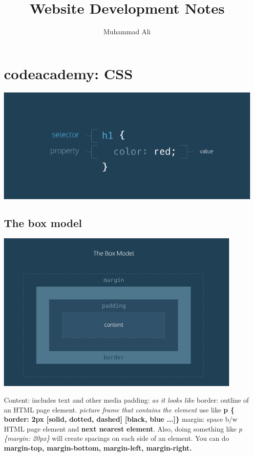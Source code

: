 \documentclass{article}
\begin{document}
\title{Website Development Notes}
\author{Muhammad Ali}
\date{}
\maketitle

\section{codeacademy: CSS}
\includegraphics[scale=0.25]{css-outline.png}
\subsection{The box model}
\includegraphics[scale=0.5]{box-model.png}

Content: includes text and other media \newline \newline
padding: \textit{as it looks like} \newline \newline
border: outline of an HTML page element. \textit{picture frame that contains the element}
use like \newline
\textbf{p \{ border: 2px [solid, dotted, dashed] [black, blue ...]\}} \newline \newline
margin: space b/w HTML page element and \textbf{next nearest element}. \newline
Also, doing something like \textit{p \{margin: 20px\}} will create spacings on each side of an element.\newline
You can do \textbf{margin-top, margin-bottom, margin-left, margin-right.}\newline \newline
\end{document}
